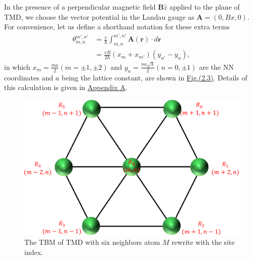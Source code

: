\documentclass{report}
\begin{document}
In the presence of a perpendicular magnetic field $\mathbf{B} \hat{z}$ applied to the plane of \ac{TMD}, we choose the vector potential in the Landau gauge as $\mathbf{A} = (0, Bx, 0)$. For convenience, let us define a shorthand notation for these extra terms 
\begin{equation}
	\begin{aligned}
		\theta_{m,n}^{m',n'}
		 & = \frac{e}{\hbar} \int_{m,n}^{m',n'} \mathbf{A}(\mathbf{r}) \cdot d\mathbf{r} \\
		 & = \frac{eB}{2\hbar}(x_{m} + x_{m'})(y_{n'} - y_{n}),
	\end{aligned}
\end{equation}
in which $x_{m} = \frac{ma}{2}(m = \pm 1, \pm 2)$ and $y_{n} = \frac{na\sqrt{3}}{2}(n = 0,\pm 1)$ are the \ac{NN} coordinates and $a$ being the lattice constant, are shown in \hyperref[fig:site index]{Fig.(2.3)}. Details of this calculation is given in \hyperref[appendix a]{Appendix A}.
\begin{figure}[H]
	\centering
	\includegraphics[width=0.85\linewidth]{pic/siteindex_crop.pdf}
	\caption{\label{fig:site index} The \ac{TBM} of \ac{TMD} with six neighbors atom $M$ rewrite with the site index.}
\end{figure}
\end{document}
